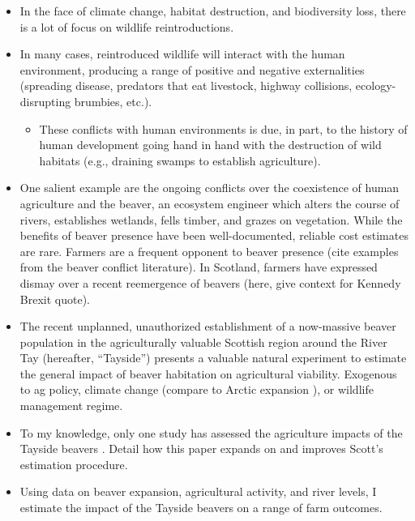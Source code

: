

\begin{itemize}
    \item In the face of climate change, habitat destruction, and biodiversity loss, there is a lot of focus on wildlife reintroductions.
    \item In many cases, reintroduced wildlife will interact with the human environment, producing a range of positive and negative externalities (spreading disease, predators that eat livestock, highway collisions, ecology-disrupting brumbies, etc.). 
    \begin{itemize}
        \item These conflicts with human environments is due, in part, to the history of human development going hand in hand with the destruction of wild habitats (e.g., draining swamps to establish agriculture). 
    \end{itemize}
    \item One salient example are the ongoing conflicts over the coexistence of human agriculture and the beaver, an ecosystem engineer which alters the course of rivers, establishes wetlands, fells timber, and grazes on vegetation. While the benefits of beaver presence have been well-documented, reliable cost estimates are rare. Farmers are a frequent opponent to beaver presence (cite examples from the beaver conflict literature). In Scotland, farmers have expressed dismay over a recent reemergence of beavers (here, give context for Kennedy Brexit quote).  
    \item The recent unplanned, unauthorized establishment of a now-massive beaver population in the agriculturally valuable Scottish region around the River Tay (hereafter, ``Tayside'') presents a valuable natural experiment to estimate the general impact of beaver habitation on agricultural viability. Exogenous to ag policy, climate change (compare to Arctic expansion \citep{tape_expanding_2022}), or wildlife management regime.
    \item To my knowledge, only one study has assessed the agriculture impacts of the Tayside beavers \citep{hamilton_tayside_2015}. Detail how this paper expands on and improves Scott's estimation procedure.
    \item Using data on beaver expansion, agricultural activity, and river levels, I estimate the impact of the Tayside beavers on a range of farm outcomes.

\end{itemize}
